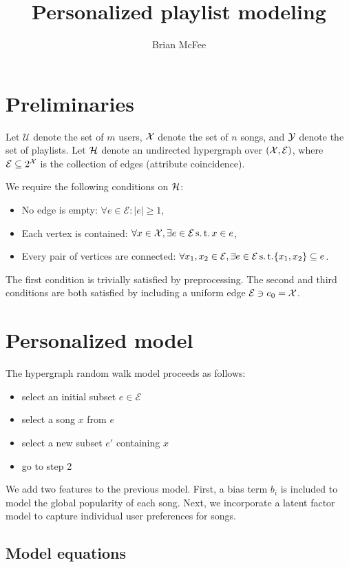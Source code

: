 \documentclass{article}
\title{Personalized playlist modeling}
\author{Brian McFee}
\def\E{\ensuremath{\mathcal{E}}}
\def\U{\ensuremath{\mathcal{U}}}
\begin{document}
\maketitle

\section{Preliminaries}

Let $\U$ denote the set of $m$ users, $\mathcal{X}$ denote the set of $n$ songs, and $\mathcal{Y}$ denote the set of playlists.
Let $\mathcal{H}$ denote an undirected hypergraph over $(\X, \E)$, where $\E \subseteq 2^\X$ is the
collection of edges (attribute coincidence).

We require the following conditions on $\mathcal{H}$:
\begin{itemize}
\item No edge is empty: $\forall e \in \E: |e| \geq 1$,
\item Each vertex is contained: $\forall x \in \X, \exists e \in \E \suchthat x \in e$,
\item Every pair of vertices are connected: $\forall x_1, x_2 \in \E, \exists e \in \E \suchthat \{x_1, x_2\} \subseteq e$.
\end{itemize}

The first condition is trivially satisfied by preprocessing.  The second and third conditions are both satisfied by including a uniform edge $\E \ni e_0 = \X$.

\section{Personalized model}

The hypergraph random walk model proceeds as follows:
\begin{itemize}
\item select an initial subset $e \in \E$
\item select a song $x$ from $e$
\item select a new subset $e'$ containing $x$
\item go to step 2
\end{itemize}

We add two features to the previous model.  First, a bias term $b_i$ is included to model the global popularity of each
song.  Next, we incorporate a latent factor model to capture individual user preferences for songs.

\subsection{Model equations}
\end{document}
